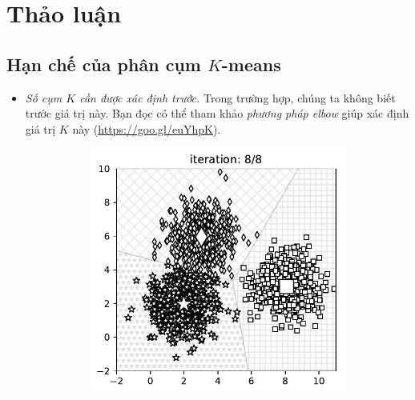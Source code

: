 \section{Thảo luận}
\subsection{Hạn chế của phân cụm $K$-means}


\begin{itemize}
\item \textit{Số cụm $K$ cần được xác định trước.}
Trong trường hợp, chúng ta không biết trước giá trị này. Bạn đọc có thể tham khảo \textit{phương pháp elbow} giúp xác định giá trị $K$ này (\url{https://goo.gl/euYhpK}).
\begin{figure}[t]
\begin{subfigure}{0.325\textwidth}
\includegraphics[width=0.99\linewidth]{ebookML_src/src/kmeans/dif_res10.pdf}
\caption{}
\label{fig:4_dif_resa}
\end{subfigure}
\begin{subfigure}{0.325\textwidth}

\end{subfigure}
\end{figure}
\end{itemize}
